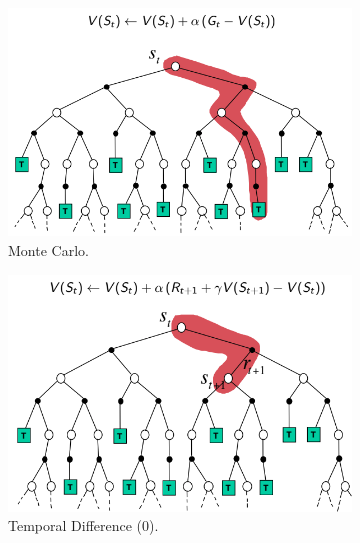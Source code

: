\documentclass[11pt]{book} %
\begin{document}
\begin{figure}
    \begin{subfigure}[b]{0.3\textwidth}
        \centering
        \includegraphics[width=\textwidth]{./Figs/MC_tree.png}
        \caption{Monte Carlo.}
        \label{fig:MC_tree}
    \end{subfigure}
    \begin{subfigure}[b]{0.3\textwidth}
        \centering
        \includegraphics[width=\textwidth]{./Figs/TD0_tree.png}
        \caption{Temporal Difference (0).}
        \label{fig:TD_tree}
    \end{subfigure}
    \begin{subfigure}[b]{0.3\textwidth}
        \centering

\end{subfigure}
\end{figure}
\end{document}
